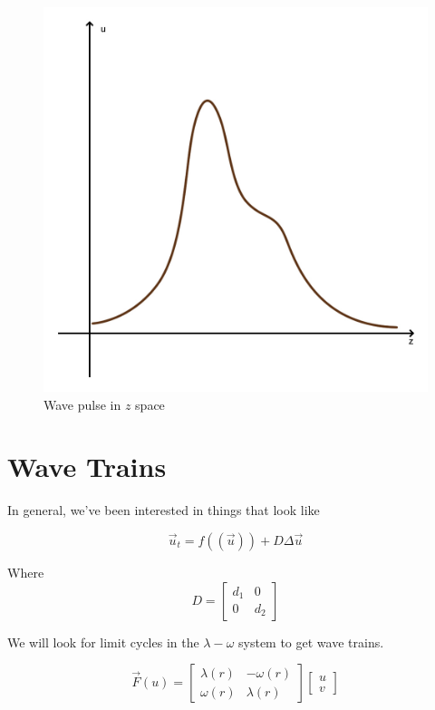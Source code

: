 \documentclass[]{article}
\numberwithin{equation}{section}		%
\begin{document}
\begin{figure}
\caption{Wave pulse in $z$ space}
\begin{center}
\includegraphics[scale=.20]{figures/Wave_pulse.jpg}
\end{center}
\label{fig:wp}
\end{figure}

\newpage
\section{Wave Trains}

In general, we've been interested in things that look like

$$\vec{u}_t=f((\vec{u}))+D\Delta\vec{u}$$

\noindent Where $$D=
\begin{bmatrix}
d_1 & 0\\
0 & d_2
\end{bmatrix}$$


\noindent We will look for limit cycles in the $\lambda-\omega$ system to get wave trains.

$$\vec{F}(u) =
 \begin{bmatrix}
\lambda(r) & -\omega(r) \\
\omega(r) & \lambda(r)
\end{bmatrix}
\begin{bmatrix}
u \\
v
\end{bmatrix}$$\
\end{document}
